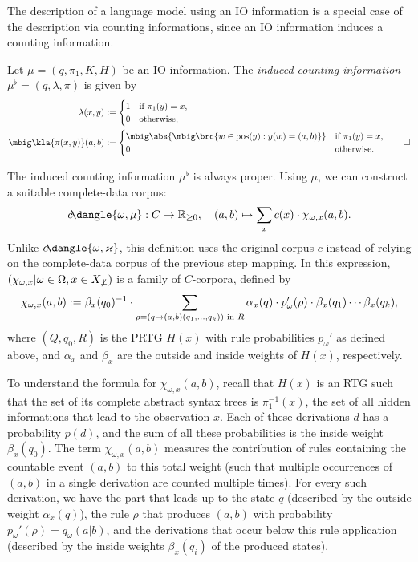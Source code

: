 The description of a language model using an IO information is a special case of
the description via counting informations, since an IO information induces a
counting information.

\begin{definition}
 Let $\mu=(q,\pi_1,K,H)$ be an IO information. The \emph{induced counting
 information} $\mu^\flat = (q,\lambda,\pi)$ is given by
 \begin{align*}
  \lambda(x,y) &:= \begin{cases}
   1 & \text{if } \pi_1(y) = x, \\
   0 & \text{otherwise},
  \end{cases} \\
  \mbig\kla{\pi(x,y)}(a,b) &:= \begin{cases}
   \mbig\abs{\mbig\brc{w\in\pos(y): y(w)=(a,b)}} & \text{if } \pi_1(y) = x, \\
   0 & \text{otherwise}.
  \end{cases}
  \qedhere
 \end{align*}
\end{definition}
The induced counting information $\mu^\flat$ is always proper.
\cite[p.~15]{bucstuvog15} Using $\mu$, we can construct a suitable complete-data corpus:
\[
 c\!\dangle{\omega,\mu}: C\to\zr_{\geq0}, \quad
 (a,b) \mapsto \sum_x c(x) \cdot \chi_{\omega,x}(a,b).
\]
Unlike $c\!\dangle{\omega,\varkappa}$, this definition uses the original corpus
$c$ instead of relying on the complete-data corpus of the previous step
mapping. In this expression, $(\chi_{\omega,x}|\omega\in\Omega,x\in
X_{\not\bot})$ is a family of $C$-corpora, defined by
\begin{equation}\label{eq:02-chi}
 \chi_{\omega,x}(a,b) := \beta_x(q_0)^{-1} \cdot \sum_{\rho = (q\to(a,b)(q_1,\ldots,q_k))\text{ in } R} \alpha_x(q) \cdot p_\omega'(\rho) \cdot \beta_x(q_1) \cdots \beta_x(q_k),
\end{equation}
where $(Q,q_0,R)$ is the PRTG $H(x)$ with rule probabilities $p_\omega'$ as defined above,
and $\alpha_x$ and $\beta_x$ are the outside and inside weights of $H(x)$, respectively.

To understand the formula for $\chi_{\omega,x}(a,b)$, recall that $H(x)$ is an
RTG such that the set of its complete abstract syntax trees is $\pi_1^{-1}(x)$,
the set of all hidden informations that lead to the observation $x$. Each of
these derivations $d$ has a probability $p(d)$, and the sum of all these
probabilities is the inside weight $\beta_x(q_0)$. The term
$\chi_{\omega,x}(a,b)$ measures the contribution of rules containing the
countable event $(a,b)$ to this total weight (such that multiple occurrences of
$(a,b)$ in a single derivation are counted multiple times). For every such
derivation, we have the part that leads up to the state $q$ (described by the
outside weight $\alpha_x(q)$), the rule $\rho$ that produces $(a,b)$ with
probability $p_\omega'(\rho) = q_\omega(a|b)$, and the derivations that occur
below this rule application (described by the inside weights $\beta_x(q_i)$ of
the produced states).

